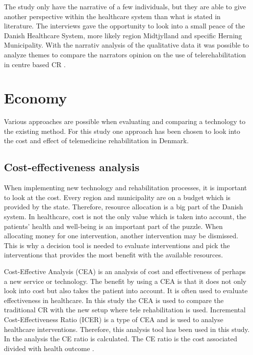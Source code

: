 The study only have the narrative of a few individuals, but they are able to give another perspective within the healthcare system than what is stated in literature. The interviews gave the opportunity to look into a small peace of the Danish Healthcare System, more likely region Midtjylland and specific Herning Municipality. With the narrativ analysis of the qualitative data it was possible to analyze themes to compare the narrators opinion on the use of telerehabilitation in centre based CR \cite{mark2009research}. 


\section{Economy}

Various approaches are possible when evaluating and comparing a technology to the existing method. For this study one approach has been chosen to look into the cost and effect of telemedicine rehabilitation in Denmark.

\subsection{Cost-effectiveness analysis}

When implementing new technology and rehabilitation processes, it is important to look at the cost. Every region and municipality are on a budget which is provided by the state. Therefore, resource allocation is a big part of the Danish system. In healthcare, cost is not the only value which is taken into account, the patients’ health and well-being is an important part of the puzzle. When allocating money for one intervention, another intervention may be dismissed. This is why a decision tool is needed to evaluate interventions and pick the interventions that provides the most benefit with the available resources.

Cost-Effective Analysis (CEA) is an analysis of cost and effectiveness of perhaps a new service or technology. The benefit by using a CEA is that it does not only look into cost but also takes the patient into account. It is often used to evaluate effectiveness in healthcare. In this study the CEA is used to compare the traditional CR with the new setup where tele rehabilitation is used. Incremental Cost-Effectiveness Ratio (ICER) is a type of CEA and is used to analyse healthcare interventions. Therefore, this analysis tool has been used in this study. In the analysis the CE ratio is calculated. The CE ratio is the cost associated divided with health outcome \cite{bang2012median}.

